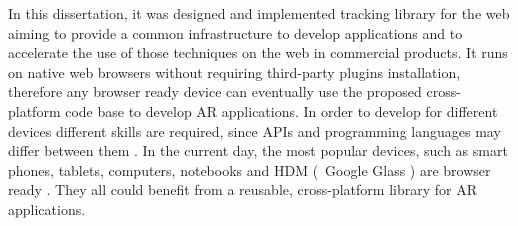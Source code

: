 In this dissertation, it was designed and implemented tracking library for the web aiming to provide a common infrastructure to develop applications and to accelerate the use of those techniques on the web in commercial products. It runs on native web browsers without requiring third-party plugins installation, therefore any browser ready device can eventually use the proposed cross-platform code base to develop AR applications. In order to develop for different devices different skills are required, since APIs and programming languages may differ between them \cite{MDN2013,International2009}. In the current day, the most popular devices, such as smart phones, tablets, computers, notebooks and HDM (\ie\ Google Glass \cite{Glass2013}) \cite{Benford1998} are browser ready \cite{Hickson2013}. They all could benefit from a reusable, cross-platform library for AR applications.



